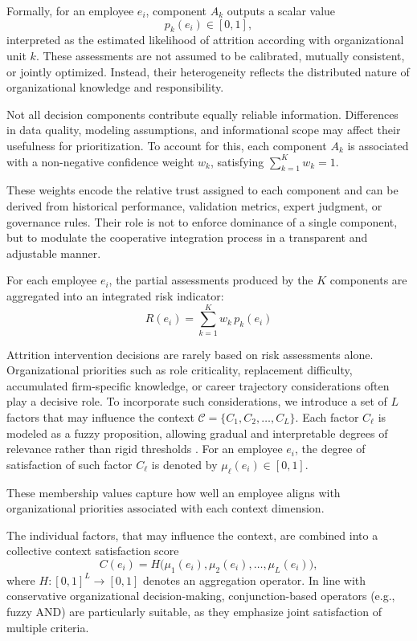 \documentclass[runningheads]{llncs}
\begin{document}
Formally, for an employee $e_i$, component $A_k$ outputs a scalar value
\[
p_k(e_i) \in [0,1],
\]
interpreted as the estimated likelihood of attrition according with organizational unit $k$.
These assessments are not assumed to be calibrated, mutually consistent, or jointly optimized.
Instead, their heterogeneity reflects the distributed nature of organizational knowledge and responsibility.

Not all decision components contribute equally reliable information.
Differences in data quality, modeling assumptions, and informational scope may affect their usefulness for prioritization. To account for this, each component $A_k$ is associated with a non-negative confidence weight $w_k$, satisfying $\sum_{k=1}^{K} w_k = 1$.

These weights encode the relative trust assigned to each component and can be derived from historical performance, validation metrics, expert judgment, or governance rules.
Their role is not to enforce dominance of a single component, but to modulate the cooperative integration process in a transparent and adjustable manner.

For each employee $e_i$, the partial assessments produced by the $K$ components are aggregated into an integrated risk indicator:
\begin{equation}\label{eq:colective_risk}
R(e_i) = \sum_{k=1}^{K} w_k \, p_k(e_i)    
\end{equation}

Attrition intervention decisions are rarely based on risk assessments alone.
Organizational priorities such as role criticality, replacement difficulty, accumulated firm-specific knowledge, or career trajectory considerations often play a decisive role. To incorporate such considerations, we introduce a set of $L$ factors that may influence the context $\mathcal{C} = \{C_1, C_2, \dots, C_L\}$. Each factor $C_\ell$ is modeled as a fuzzy proposition, allowing gradual and interpretable degrees of relevance rather than rigid thresholds \cite{ref_perezcanedo2023}.
For an employee $e_i$, the degree of satisfaction of such factor $C_\ell$ is denoted by $\mu_\ell(e_i) \in [0,1]$.

These membership values capture how well an employee aligns with organizational priorities associated with each context dimension.

The individual factors, that may influence the context, are combined into a collective context satisfaction score
\[
C(e_i) = H\big(\mu_1(e_i), \mu_2(e_i), \dots, \mu_L(e_i)\big),
\]
where $H: [0,1]^L\rightarrow[0, 1]$ denotes an aggregation operator.
In line with conservative organizational decision-making, conjunction-based operators (e.g., fuzzy AND) are particularly suitable, as they emphasize joint satisfaction of multiple criteria.
\end{document}

